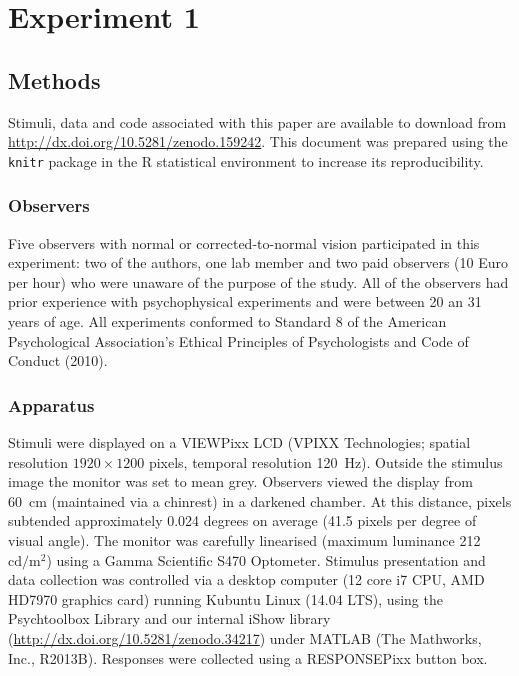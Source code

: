 \documentclass[doc, 11pt,a4paper,natbib]{apa6}\usepackage[]{graphicx}\usepackage[]{color}
\begin{document}
\section{Experiment 1}


\subsection{Methods}

Stimuli, data and code associated with this paper are available to download from \url{http://dx.doi.org/10.5281/zenodo.159242}.
This document was prepared using the \texttt{knitr} package \citep{xie_knitr_2013, xie_dynamic_2015} in the R statistical environment \citep{r_core_development_team_r:_2016,wickham_dplyr:_2016,wickham_ggplot2_2009,wickham_splitapplycombine_2011, auguie_gridextra:_2016, arnold_ggthemes:_2016} to increase its reproducibility.

\subsubsection{Observers}

Five observers with normal or corrected-to-normal vision participated in this experiment: two of the authors, one lab member and two paid observers (10 Euro per hour) who were unaware of the purpose of the study. All of the observers had prior experience with psychophysical experiments and were between 20 an 31 years of age.
All experiments conformed to Standard 8 of the American Psychological Association's Ethical Principles of Psychologists and Code of Conduct (2010).

\subsubsection{Apparatus}

Stimuli were displayed on a VIEWPixx LCD (VPIXX Technologies; spatial resolution $1920 \times 1200$ pixels, temporal resolution 120~Hz).
Outside the stimulus image the monitor was set to mean grey.
Observers viewed the display from 60~cm (maintained via a chinrest) in a darkened chamber.
At this distance, pixels subtended approximately 0.024 degrees on average (41.5 pixels per degree of visual angle).
The monitor was carefully linearised (maximum luminance 212~$\mathrm{cd}/ \mathrm{m}^2$) using a Gamma Scientific S470 Optometer.
Stimulus presentation and data collection was controlled via a desktop computer (12 core i7 CPU, AMD HD7970 graphics card) running Kubuntu Linux (14.04 LTS), using the Psychtoolbox Library \citep[][version 3.0.11]{kleiner_whats_2007,pelli_videotoolbox_1997,brainard_psychophysics_1997} and our internal iShow library (\url{http://dx.doi.org/10.5281/zenodo.34217}) under MATLAB (The Mathworks, Inc., R2013B).
Responses were collected using a RESPONSEPixx button box.
\end{document}
